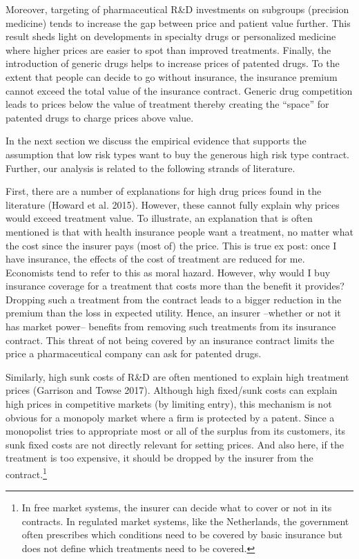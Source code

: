 \documentclass[a4paper,12pt]{article}
\makeatletter
\newcommand{\citeprocitem}[2]{\hyper@linkstart{cite}{citeproc_bib_item_#1}#2\hyper@linkend}
\makeatother
\begin{document}
Moreover, targeting of pharmaceutical R\&D investments on subgroups (precision medicine) tends to increase the gap between price and patient value further. This result sheds light on developments in specialty drugs or personalized medicine where higher prices are easier to spot than improved treatments. Finally, the introduction of generic drugs helps to increase prices of patented drugs. To the extent that people can decide to go without insurance, the insurance premium cannot exceed the total value of the insurance contract. Generic drug competition leads to prices below the value of treatment thereby creating the ``space'' for patented drugs to charge prices above value.

In the next section we discuss the empirical evidence that supports the assumption that low risk types want to buy the generous high risk type contract. Further, our analysis is related to the following strands of literature. 

First, there are a number of explanations for high drug prices found in the literature (\citeprocitem{23}{Howard et al. 2015}). However,  these cannot fully explain why prices would exceed treatment value. To illustrate, an explanation that is often mentioned is that with health insurance people want a treatment, no matter what the cost since the insurer pays (most of) the price. This is true ex post: once I have insurance, the effects of the cost of treatment are reduced for me. Economists tend to refer to this as moral hazard. However, why would I buy insurance coverage for a treatment that costs more than the benefit it provides? Dropping such a treatment from the contract leads to a bigger reduction in the premium than the loss in expected utility. Hence, an insurer --whether or not it has market power-- benefits from removing such treatments from its insurance contract. This threat of not being covered by an insurance contract limits the price a pharmaceutical company can ask for patented drugs.

Similarly, high sunk costs of R\&D are often mentioned to explain high treatment prices (\citeprocitem{17}{Garrison and Towse 2017}). Although high fixed/sunk costs can explain high prices in competitive markets (by limiting entry), this mechanism is not obvious for a monopoly market where a firm is protected by a patent. Since a monopolist tries to appropriate most or all of the surplus from its customers, its sunk fixed costs are not directly relevant for setting prices. And also here, if the treatment is too expensive, it should be dropped by the insurer from the contract.\footnote{In free market systems, the insurer can decide what to cover or not in its contracts. In regulated market systems, like the Netherlands, the government often prescribes which conditions need to be covered by basic insurance but does not define which treatments need to be covered.}
\end{document}

